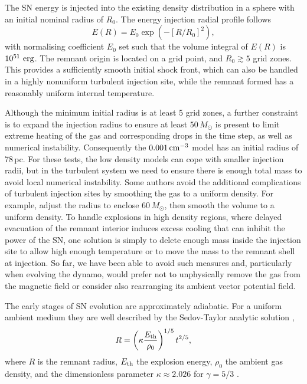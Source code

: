 \documentclass[fleqn,usenatbib]{mnras}
\newcommand\EST{E_{\rm th}}
\newcommand\erg{~ {\rm erg}}
\def\cmcube{{\,{\rm cm}^{-3}}}
\begin{document}
The SN energy is injected into the existing density distribution
in a sphere with an initial nominal radius of {$R_0$}.
The energy injection radial profile follows 
\begin{equation}  
   E(R) = E_0\exp\left(-\left[
   R/{R_0}
\right]^{{2}}\right),
\end{equation}
with normalising coefficient $E_0$ set such that the volume integral of $E(R)$ 
is $10^{51}\erg$.
{The remnant origin is located on a grid point, and $R_0\gtrsim5$
grid zones.}
This provides a sufficiently smooth initial shock front, which can also be
handled in a highly nonuniform turbulent injection site, while the remnant 
formed has a reasonably uniform internal temperature.

Although the minimum initial radius is {at least 5 grid zones}, a further constraint
is to expand the injection radius to ensure at least ${50}\, M_\odot$ is
present
  {to limit extreme heating of the gas and corresponding drops in
    the time step, as well as numerical instability}.
Consequently the $0.001\cmcube$ model has an initial radius of 78\,pc.
For these tests, the low density models can cope with smaller injection radii,
but in the turbulent system we need to ensure there is enough total mass to 
avoid local numerical instability.
Some authors avoid the additional complications of turbulent injection sites
by smoothing the gas to a uniform density. 
For example, \citet{Joung:2006} adjust the radius to enclose $60\, M_\odot$,
then smooth the volume to a uniform density.
To handle explosions in high density regions, {where delayed evacuation
of the remnant interior induces excess} cooling {that} can inhibit the
power of the SN, one solution is simply to delete enough mass inside the injection
site to allow high enough temperature  or to move the mass to the
remnant shell at injection.
So far, we have been able to avoid such measures and, particularly when
evolving the dynamo, would prefer not to unphysically remove the gas from the
magnetic field or consider also rearranging {its} ambient {vector}
potential field.

  The early stages of SN evolution are approximately adiabatic.
  For a uniform ambient medium they are well described by
  the Sedov-Taylor analytic solution \citep{Taylor50,Sedov59},
  \begin{equation}
    \label{eq:sed}
    R= \left(\kappa\frac{\EST}{\rho_{0}}\right)^{{1}/{5}}t^{{2}/{5}},
  \end{equation}
  where $R$ is the remnant radius, $\EST$ the explosion energy, $\rho_{0}$ the
  ambient gas density, and the dimensionless parameter $\kappa\approx2.026$ for
  $\gamma=5/3$ \citep{Ostriker88}.
\end{document}
